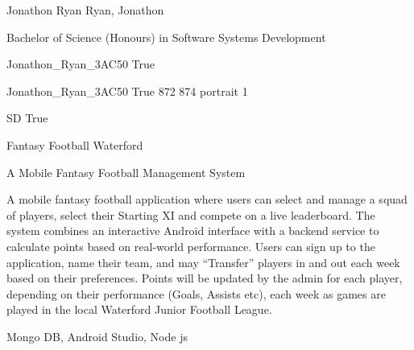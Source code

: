 \documentclass[twoside]{report}
\begin{document}
\begingroup{}\relax



\def\Key{Jonathon_Ryan_3AC50}

{Jonathon Ryan}
{Ryan, Jonathon}

{Bachelor of Science (Honours) in Software Systems Development}

{Jonathon_Ryan_3AC50}
{True}

{Jonathon_Ryan_3AC50}
{True}
{872}
{874}
{portrait}
{1}

{SD}
{True}

{Fantasy Football Waterford}

{A Mobile Fantasy Football Management System}

{A mobile fantasy football application where users can select and manage a squad of players, select their Starting XI and compete on a live leaderboard. The system combines an interactive Android interface with a backend service to calculate points based on real-world performance. Users can sign up to the application, name their team, and may \textquotedblleft{}Transfer\textquotedblright{} players in and out each week based on their preferences. Points will be updated by the admin for each player, depending on their performance (Goals, Assists etc), each week as games are played in the local Waterford Junior Football League.}

{Mongo DB, Android Studio, Node js}
\end{document}
